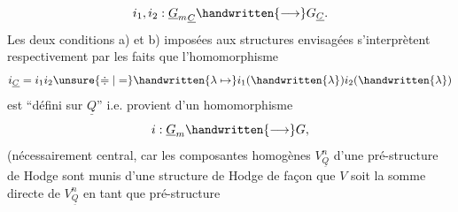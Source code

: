 \[
i_1,i_2:{\underline{G}_m}_{\underline{C}}\handwritten{\longrightarrow}G_{\underline{C}}.
\]
Les deux conditions a) et b) imposées aux structures envisagées s'interprètent respectivement par les faits que l'homomorphisme
\[
i_{\underline{C}}=i_1i_2\unsure{\doteqdot|=}\handwritten{\lambda\mapsto}i_1(\handwritten{\lambda})i_2(\handwritten{\lambda})
\]
est ``défini sur $\underline{Q}$'' i.e. provient d'un homomorphisme
\[
i:\underline{G}_m\handwritten{\longrightarrow}G,
\]
(nécessairement central, car les composantes homogènes $V_{\underline{Q}}^n$ d'une pré-structure de Hodge sont  munis d'une structure de Hodge de façon que $V$ soit la somme directe de $V_{\underline{Q}}^n$ en tant que pré-structure

